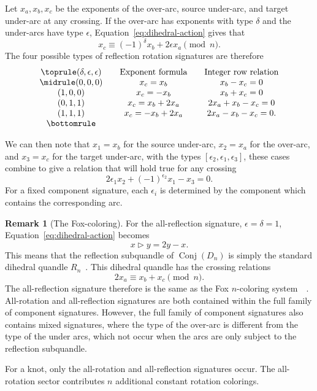 \documentclass[11pt]{article}
\theoremstyle{definition}
\newtheorem{remark}[theorem]{Remark}
\newcommand{\Conj}{\operatorname{Conj}}
\begin{document}
Let $x_a,x_b,x_c$ be the exponents of the over-arc, source under-arc, and target under-arc at any crossing. If the over-arc has exponents with type $\delta$ and the under-arcs have type $\epsilon$, Equation~\eqref{eq:dihedral-action} gives that
\begin{equation}
x_c\equiv(-1)^\delta x_b+2\epsilon x_a\pmod n.
\label{eq:local-relation}
\end{equation}
The four possible types of reflection rotation signatures are therefore~\cite[Lemma~2.1]{IIMS2025}
\[
\begin{array}{c@{\qquad}c@{\qquad}c}
\toprule
(\delta,\epsilon,\epsilon) & \text{Exponent formula} & \text{Integer row relation}\\
\midrule
(0,0,0) & x_c=x_b & x_b-x_c=0\\
(1,0,0) & x_c=-x_b & x_b+x_c=0\\
(0,1,1) & x_c=x_b+2x_a & 2x_a+x_b-x_c=0\\
(1,1,1) & x_c=-x_b+2x_a & 2x_a-x_b-x_c=0.\\
\bottomrule
\end{array}
\]

We can then note that $x_1=x_b$ for the source under-arc, $x_2=x_a$ for the over-arc, and $x_3=x_c$ for the target under-arc, with the types $[\epsilon_2,\epsilon_1,\epsilon_3]$, these cases combine to give a relation that will hold true for any crossing
\begin{equation}
2\epsilon_1x_2+(-1)^{\epsilon_2}x_1-x_3=0.
\label{eq:universal-crossing}
\end{equation}
For a fixed component signature, each $\epsilon_i$ is determined by the component which contains the corresponding arc.

\begin{remark}[The Fox-coloring]
For the all-reflection signature, $\epsilon=\delta=1$, Equation~\eqref{eq:dihedral-action} becomes
\[
x\triangleright y=2y-x.
\]
This means that the reflection subquandle of $\Conj(D_n)$ is simply the standard dihedral quandle $R_n$~\cite[p.~105]{kamada2002}. This dihedral quandle has the crossing relations
\[
2x_a\equiv x_b+x_c\pmod n.
\]
The all-reflection signature therefore is the same as the Fox $n$-coloring system~\cite[Remark~2]{IIMS2025}~\cite[Section~2.1]{kauffman}. All-rotation and all-reflection signatures are both contained within the full family of component signatures. However, the full family of component signatures also contains mixed signatures, where the type of the over-arc is different from the type of the under arcs, which not occur when the arcs are only subject to the reflection subquandle.

For a knot, only the all-rotation and all-reflection signatures occur. The all-rotation sector contributes $n$ additional constant rotation colorings.
\end{remark}
\end{document}
